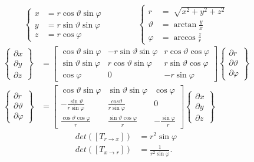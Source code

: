 \begin{equation}
\label{eq:4sferiche1}
\left\{
\begin{aligned}
x &= r \cos \vartheta\sin\varphi\\
y &= r \sin\vartheta\sin\varphi\\
z &= r \cos \varphi
\end{aligned}
\right. 
\qquad\qquad
\left\{
\begin{aligned}
r &= \sqrt[]{x^2+y^2+z^2}\\
\vartheta &= \arctan \frac{y}{x}\\
\varphi &= \arccos\frac{z}{r}
\end{aligned}
\right.
\end{equation}
\begin{align}
\label{eq:4sferiche2}
\left\{\begin{aligned}\partial x\\ \partial y\\ \partial z\end{aligned}\right\}
&= \left[\begin{array}{ccc}
\cos \vartheta\sin\varphi &-r\sin\vartheta\sin\varphi & r\cos\vartheta\cos\varphi\\
\sin \vartheta\sin\varphi & r\cos\vartheta\sin\varphi & r\sin\vartheta\cos\varphi\\
\cos\varphi & 0 & -r\sin\varphi\end{array}\right]
\left\{\begin{aligned}\partial r\\ \partial\vartheta\\ \partial\varphi\end{aligned}\right\}\\
\label{eq:4sferiche3}
\left\{\begin{aligned}\partial r\\ \partial\vartheta\\ \partial\varphi\end{aligned}\right\}
&= \left[\begin{array}{ccc}
\cos \vartheta\sin\varphi &\sin\vartheta\sin\varphi & \cos\varphi\\
-\frac{\sin \vartheta}{r\sin\varphi} & \frac{cos\vartheta}{r\sin\varphi} & 0\\
\frac{\cos\vartheta\cos\varphi}{r} & \frac{\sin\vartheta\cos\varphi}{r} & -\frac{\sin\varphi}{r}\end{array}\right]
\left\{\begin{aligned}\partial x\\ \partial y\\ \partial z\end{aligned}\right\}
\end{align}
\begin{align}
\label{eq:4sferiche4_a}
det\left(\left[T_{r\rightarrow x}\right]\right) &= r^2 \sin\varphi\\
\label{eq:4sferiche4_b}
det\left(\left[T_{x\rightarrow r}\right]\right) &= \frac{1}{r^2\sin\varphi}.
\end{align}

